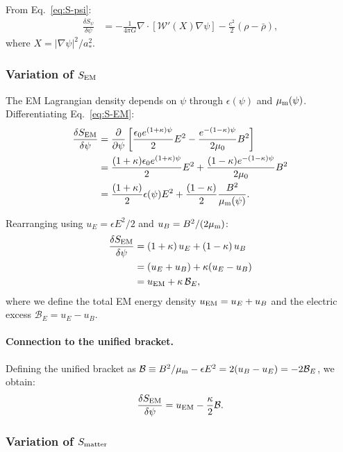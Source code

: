 \documentclass[aps,prd,twocolumn,superscriptaddress,floatfix,nofootinbib]{revtex4-2}
\newcommand{\astar}{a_*}
\newcommand{\Wfunc}{\mathcal{W}}
\newcommand{\kap}{\kappa}
\newcommand{\calB}{\mathcal{B}}
\begin{document}
From Eq.~\eqref{eq:S-psi}:
\begin{align}
\frac{\delta S_\psi}{\delta\psi} &=
-\frac{1}{4\pi G}\nabla\cdot\!\left[\Wfunc'(X)\nabla\psi\right]
- \frac{c^2}{2}(\rho - \bar{\rho}),
\label{eq:dSpsi}
\end{align}
where $X = |\nabla\psi|^2/\astar^2$.

\subsubsection{Variation of $S_{\rm EM}$}

The EM Lagrangian density depends on $\psi$ through $\epsilon(\psi)$
and $\mu_{\rm m}(\psi)$. Differentiating Eq.~\eqref{eq:S-EM}:
\begin{align}
\frac{\delta S_{\rm EM}}{\delta\psi} &=
\frac{\partial}{\partial\psi}\left[
  \frac{\epsilon_0 e^{(1+\kap)\psi}}{2}E^2
  - \frac{e^{-(1-\kap)\psi}}{2\mu_0}B^2
\right] \notag\\
&= \frac{(1+\kap)\epsilon_0 e^{(1+\kap)\psi}}{2}E^2
+ \frac{(1-\kap)e^{-(1-\kap)\psi}}{2\mu_0}B^2 \notag\\
&= \frac{(1+\kap)}{2}\epsilon(\psi)E^2
+ \frac{(1-\kap)}{2}\frac{B^2}{\mu_{\rm m}(\psi)}.
\label{eq:dSEM-full}
\end{align}

Rearranging using $u_E = \epsilon E^2/2$ and $u_B = B^2/(2\mu_{\rm m})$:
\begin{align}
\frac{\delta S_{\rm EM}}{\delta\psi} &=
(1+\kap)\,u_E + (1-\kap)\,u_B \notag\\
&= (u_E + u_B) + \kap(u_E - u_B) \notag\\
&= u_{\rm EM} + \kap\,\calB_E,
\label{eq:dSEM-decomp}
\end{align}
where we define the total EM energy density $u_{\rm EM} = u_E + u_B$
and the electric excess $\calB_E = u_E - u_B$.

\paragraph{Connection to the unified bracket.}
Defining the unified bracket as
$\calB \equiv B^2/\mu_{\rm m} - \epsilon E^2 = 2(u_B - u_E)
= -2\calB_E$, we obtain:
\begin{equation}
\frac{\delta S_{\rm EM}}{\delta\psi} =
u_{\rm EM} - \frac{\kap}{2}\calB.
\label{eq:dSEM-bracket}
\end{equation}

\subsubsection{Variation of $S_{\rm matter}$}
\end{document}
